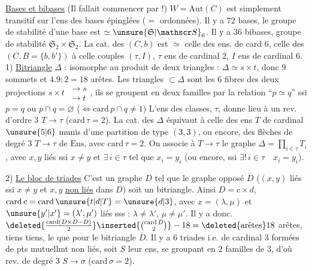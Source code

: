 \uline{Bases et bibases} (Il fallait commencer par !)
$W=\mathrm{Aut}(C)$ est simplement transitif sur l'ens des bases épinglées ($=$ ordonnées). Il y a $72$ bases, le groupe de stabilité d'une base est $\simeq\unsure{\mathfrak S|\mathscr S}_6$. Il y a $36$ bibases, groupe de stabilité $\mathfrak S_2\times\mathfrak S_2$.
La cat. des $(C,b)$ est $\simeq$ celle des ens. de card $6$, celle des $(C,B=\{b,b'\})$ à celle  couples $(\tau,I)$, $\tau$ ens de cardinal $2$, $I$ ens de cardinal $6$.
1) \uline{Bitriangle} $\Delta$ :  isomorphe au  produit de deux triangles : $\Delta\simeq s\times t$,    donc $9$ sommets et $4.9:2=18$ arêtes.
Les triangles $\subset\Delta$ sont les $6$ fibres des deux projections $s\times t\ \substack{\longrightarrow s\\\longrightarrow t}$,  ils se groupent en deux familles par la relation \textquotedblleft$p\simeq q$'' ssi $p=q$ ou $p\cap q=\varnothing$ ($\Longleftrightarrow\mathrm{card}\,p\cap q\ne1$) L'ens des classes, $\tau$, donne lieu à un rev. d'ordre $3$ $T\longrightarrow\tau$ ($\mathrm{card}\,\tau=2$).
La cat. des $\Delta$ équivaut à celle des ens $T$ de cardinal $\unsure{5|6}$ munis d'une partition de type $(3,3)$, ou encore, des flèches de degré $3$ $T\longrightarrow\tau$ de $\mathrm{Ens}$, avec $\mathrm{card}\,\tau=2$. On associe à $T\longrightarrow\tau$ le graphe $\Delta=\prod_{i\in\tau}T_i$, avec  $x,y$ \inserted{$\in\Delta$} liés ssi $x\ne y$ et  $\exists\,i\in\tau$ tel que $x_i=y_i$ (ou encore, ssi $\exists!\,i\in\tau\quad x_i=y_i$).

2) \uline{Le bloc de triades} C'est un graphe  $D$ tel que le graphe opposé $\overline D$ ($(x,y)$ liés  ssi $x\ne y$ et $x,y$ \uline{non liés} dans $D$) soit un bitriangle. Ainsi $D=c\times d$, $\mathrm{card}\,c=\mathrm{card}\,\unsure{t|d|T}=\unsure{d|3}$, avec $x=(\lambda,\mu)$ et $\unsure{y'|x'}=(\lambda',\mu')$ liés sss : $\lambda\ne\lambda'$, $\mu\ne\mu'$. Il y a donc.
$\deleted{\frac{\mathrm{card}(D\times D-D)}{2}}\inserted{\binom{\mathrm{card}\,D}{2}}-18=\deleted{\text{arêtes}}18$ arêtes,  tiens tiens, le  que pour le bitriangle $\overline D$. Il y a $6$ triades i.e.   de cardinal $3$ formées de pts mutuellmt non liés, soit $S$ leur ens, se groupant en $2$ familles de $3$, d'où rev. de degré $3$ $S\to\sigma$ ($\mathrm{card}\,\sigma=2$).

